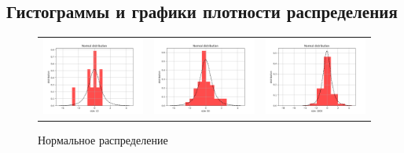 \documentclass[../main.tex]{subfiles}
\begin{document}
\subsection{Гистограммы и графики плотности распределения}
	\begin{figure}[H]
		\centering
		\begin{tabular}{ccc}
			\includegraphics[width=55mm, height =0.25\textheight]{figures/NormalNumber10.png} 
			&
			\includegraphics[width=55mm, height =0.25\textheight]{figures/NormalNumber50.png}
			&
			\includegraphics[width=55mm, height =0.25\textheight]{figures/NormalNumber1000.png}
		\end{tabular}
		\caption{Нормальное распределение} 
		\label{fig:normal}
	\end{figure}
	
\end{document}
